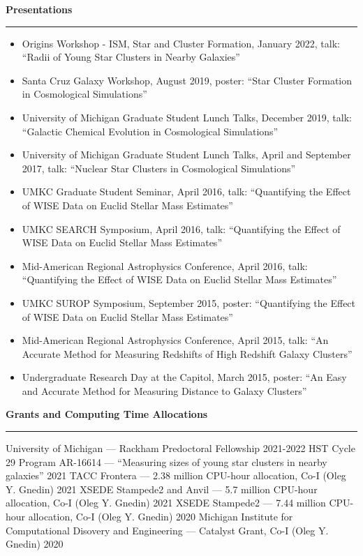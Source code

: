 \documentclass[10pt]{article}
\newcommand{\header}[1]{\vspace{2em}\par \textbf{\large #1}\strut\hrule\vspace{0em}}
\newcommand{\justifiedItemDate}[2]{\newline\null#1 \hfill #2}
\newcommand{\justifiedItemDateFirst}[2]{#1 \hfill #2}
\begin{document}
\header{Presentations}
\begin{itemize}
    \item Origins Workshop - ISM, Star and Cluster Formation, January 2022, talk: ``Radii of Young Star Clusters in Nearby Galaxies''
    \item Santa Cruz Galaxy Workshop, August 2019, poster: ``Star Cluster Formation in Cosmological Simulations''
    \item University of Michigan Graduate Student Lunch Talks, December 2019, talk: ``Galactic Chemical Evolution in Cosmological Simulations''
    \item University of Michigan Graduate Student Lunch Talks, April and September 2017, talk: ``Nuclear Star Clusters in Cosmological Simulations''
    \item UMKC Graduate Student Seminar, April 2016, talk: ``Quantifying the Effect of WISE Data on Euclid Stellar Mass Estimates''
    \item UMKC SEARCH Symposium, April 2016, talk: ``Quantifying the Effect of WISE Data on Euclid Stellar Mass Estimates''
    \item Mid-American Regional Astrophysics Conference, April 2016, talk: ``Quantifying the Effect of WISE Data on Euclid Stellar Mass Estimates''
    \item UMKC SUROP Symposium, September 2015, poster: ``Quantifying the Effect of WISE Data on Euclid Stellar Mass Estimates''
    \item Mid-American Regional Astrophysics Conference, April 2015, talk: ``An Accurate Method for Measuring Redshifts of High Redshift Galaxy Clusters''
    \item Undergraduate Research Day at the Capitol, March 2015, poster: ``An Easy and Accurate Method for Measuring Distance to Galaxy Clusters''
\end{itemize}


\header{Grants and Computing Time Allocations}
\justifiedItemDateFirst{University of Michigan --- Rackham Predoctoral Fellowship}{2021-2022}
\justifiedItemDate{HST Cycle 29 Program AR-16614 --- ``Measuring sizes of young
star clusters in nearby galaxies''}{2021}
\justifiedItemDate{TACC Frontera --- 2.38 million CPU-hour allocation, Co-I (Oleg Y. Gnedin)}{2021}
\justifiedItemDate{XSEDE Stampede2 and Anvil --- 5.7 million CPU-hour allocation, Co-I (Oleg Y. Gnedin)}{2021}
\justifiedItemDate{XSEDE Stampede2 --- 7.44 million CPU-hour allocation, Co-I (Oleg Y. Gnedin)}{2020}
\justifiedItemDate{Michigan Institute for Computational Disovery and Engineering --- Catalyst Grant, Co-I (Oleg Y. Gnedin)}{2020}
\end{document}
